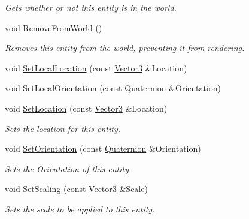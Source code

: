\begin{DoxyCompactItemize}
\begin{DoxyCompactList}\small\item\em Gets whether or not this entity is in the world. \item\end{DoxyCompactList}\item 
void \hyperlink{classMezzanine_1_1Entity_aa06ec4c242877260d6ca16a512294bf7}{RemoveFromWorld} ()
\begin{DoxyCompactList}\small\item\em Removes this entity from the world, preventing it from rendering. \item\end{DoxyCompactList}\item 
void \hyperlink{classMezzanine_1_1Entity_adb3d57eff59eba586a6c623264f38072}{SetLocalLocation} (const \hyperlink{classMezzanine_1_1Vector3}{Vector3} \&Location)
\item 
void \hyperlink{classMezzanine_1_1Entity_a82485a3020bdba45744b094e08eaf087}{SetLocalOrientation} (const \hyperlink{classMezzanine_1_1Quaternion}{Quaternion} \&Orientation)
\item 
void \hyperlink{classMezzanine_1_1Entity_a6cb6c8f304e3cc30b7e6fdaa788e30a9}{SetLocation} (const \hyperlink{classMezzanine_1_1Vector3}{Vector3} \&Location)
\begin{DoxyCompactList}\small\item\em Sets the location for this entity. \item\end{DoxyCompactList}\item 
void \hyperlink{classMezzanine_1_1Entity_ad498093c5a2b8ef3bfb9311aff719d67}{SetOrientation} (const \hyperlink{classMezzanine_1_1Quaternion}{Quaternion} \&Orientation)
\begin{DoxyCompactList}\small\item\em Sets the Orientation of this entity. \item\end{DoxyCompactList}\item 
void \hyperlink{classMezzanine_1_1Entity_a91b2952a411d8ed80e0f809944c591b4}{SetScaling} (const \hyperlink{classMezzanine_1_1Vector3}{Vector3} \&Scale)
\begin{DoxyCompactList}\small\item\em Sets the scale to be applied to this entity. \item\end{DoxyCompactList}\end{DoxyCompactItemize}
